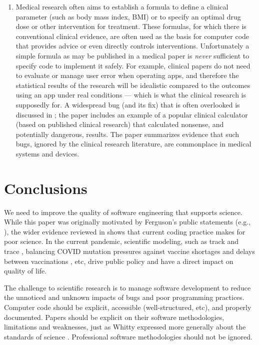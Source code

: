 \documentclass[10pt,letterpaper]{article}
\def \citeeg#1{(e.g., \cite{#1})}
\begin{document}
\begin{enumerate}
\item
Medical research often aims to establish a formula to define a clinical parameter (such as body mass index, BMI) or to specify an optimal drug dose or other intervention for treatment. These formulas, for which there is conventional clinical evidence, are often used as the basis for computer code that provides advice or even directly controls interventions. Unfortunately a simple formula as may be published in a medical paper is \emph{never\/} sufficient to specify code to implement it safely. For example, clinical papers do not need to evaluate or manage user error when operating apps, and therefore the statistical results of the research will be idealistic compared to the outcomes using an app under real conditions --- which is what the clinical research is supposedly for. A widespread bug (and its fix) that is often overlooked is discussed in \cite{numerals}; the paper includes an example of a popular clinical calculator (based on published clinical research) that calculated nonsense, and potentially dangerous, results. The paper \cite{fda} summarizes evidence that such bugs, ignored by the clinical research literature, are commonplace in medical systems and devices.
\end{enumerate}

\section{Conclusions}
We need to improve the quality of software engineering that supports science. While this paper was originally motivated by Ferguson's public statements \citeeg{tweet,ferguson-interview}, the wider evidence reviewed in shows that current coding practice makes for poor science. In the current pandemic, scientific modeling, such as track and trace \cite{excel-fiasco}, balancing COVID mutation pressures against vaccine shortages and delays between vaccinations \cite{science-delays}, etc, drive public policy and have a direct impact on quality of life.

The challenge to scientific research is to manage software development to reduce the unnoticed and unknown impacts of bugs and poor programming practices. Computer code should be explicit, accessible (well-structured, etc), and properly documented. Papers should be explicit on their software methodologies, limitations and weaknesses, just as Whitty expressed more generally about the standards of science \cite{whitty}. Professional software methodologies should not be ignored.
\end{document}
